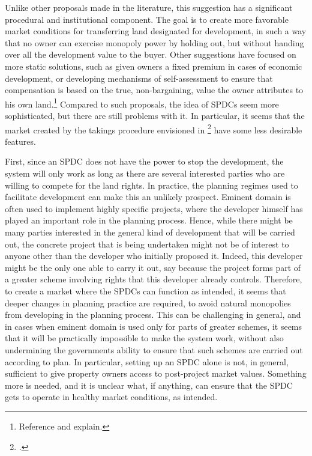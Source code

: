 Unlike other proposals made in the literature, this suggestion has a significant procedural and institutional component. The goal is to create more favorable market conditions for transferring land designated for development, in such a way that no owner can exercise monopoly power by holding out, but without handing over all the development value to the buyer. Other suggestions have focused on more static solutions, such as given owners a fixed premium in cases of economic development, or developing mechanisms of self-assessment to ensure that compensation is based on the true, non-bargaining, value the owner attributes to his own land.\footnote{Reference and explain.} Compared to such proposals, the idea of SPDCs seem more sophisticated, but there are still problems with it. In particular, it seems that the market created by the takings procedure envisioned in \footcite{eminc07} have some less desirable features.

First, since an SPDC does not have the power to stop the development, the system will only work as long as there are several interested parties who are willing to compete for the land rights. In practice, the planning regimes used to facilitate development can make this an unlikely prospect. Eminent domain is often used to implement highly specific projects, where the developer himself has played an important role in the planning process. Hence, while there might be many parties interested in the general kind of development that will be carried out, the concrete project that is being undertaken might not be of interest to anyone other than the developer who initially proposed it. Indeed, this developer might be the only one able to carry it out, say because the project forms part of a greater scheme involving rights that this developer already controls. Therefore, to create a market where the SPDCs can function as intended, it seems that deeper changes in planning practice are required, to avoid natural monopolies from developing in the planning process. This can be challenging in general, and in cases when eminent domain is used only for parts of greater schemes, it seems that it will be practically impossible to make the system work, without also undermining the governments ability to ensure that such schemes are carried out according to plan. In particular, setting up an SPDC alone is not, in general, sufficient to give property owners access to post-project market values. Something more is needed, and it is unclear what, if anything, can ensure that the SPDC gets to operate in healthy market conditions, as intended.

